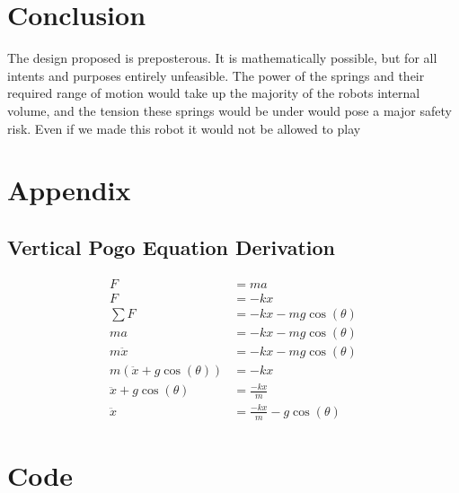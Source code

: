 \documentclass[12pt, letterpaper]{article}
\begin{document}
\section{Conclusion}
The design proposed is preposterous. It is mathematically possible, but for all intents and purposes entirely
unfeasible. The power of the springs and their required range of motion would take up the majority of the
robots internal volume, and the tension these springs would be under would pose a major safety risk. Even if
we made this robot it would not be allowed to play

\newpage{}
\printbibliography{}

\newpage{}
\section{Appendix}
\listoffigures{}


\begin{singlespace}
\subsection*{Vertical Pogo Equation Derivation}
\begin{equation}
  \label{eq:derivation}
  \begin{split}
    F &= ma \\
    F &= -kx \\
    \sum F &= -kx - mg\cos(\theta) \\
    ma &= -kx - mg\cos(\theta) \\
    m\ddot{x} &= -kx - mg\cos(\theta) \\
    m(\ddot{x} + g\cos(\theta)) &= -kx \\
    \ddot{x} + g\cos(\theta) &= \frac{-kx}{m} \\
    \ddot{x} &= \frac{-kx}{m} - g\cos(\theta)
  \end{split}
\end{equation}
\end{singlespace}

\section*{Code}

\end{document}
